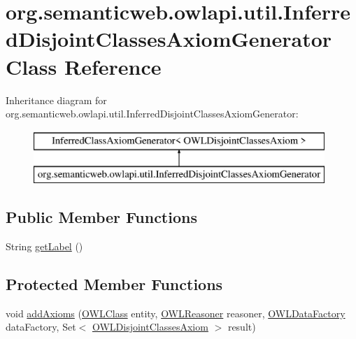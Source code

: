 \hypertarget{classorg_1_1semanticweb_1_1owlapi_1_1util_1_1_inferred_disjoint_classes_axiom_generator}{\section{org.\-semanticweb.\-owlapi.\-util.\-Inferred\-Disjoint\-Classes\-Axiom\-Generator Class Reference}
\label{classorg_1_1semanticweb_1_1owlapi_1_1util_1_1_inferred_disjoint_classes_axiom_generator}
}
Inheritance diagram for org.\-semanticweb.\-owlapi.\-util.\-Inferred\-Disjoint\-Classes\-Axiom\-Generator\-:\begin{figure}[H]
\begin{center}
\leavevmode
\includegraphics[height=2.000000cm]{classorg_1_1semanticweb_1_1owlapi_1_1util_1_1_inferred_disjoint_classes_axiom_generator}
\end{center}
\end{figure}
\subsection*{Public Member Functions}
\begin{DoxyCompactItemize}
\item 
String \hyperlink{classorg_1_1semanticweb_1_1owlapi_1_1util_1_1_inferred_disjoint_classes_axiom_generator_a35dfab107c6840751e97efc6fca793c7}{get\-Label} ()
\end{DoxyCompactItemize}
\subsection*{Protected Member Functions}
\begin{DoxyCompactItemize}
\item 
void \hyperlink{classorg_1_1semanticweb_1_1owlapi_1_1util_1_1_inferred_disjoint_classes_axiom_generator_a0fd3cd13f8f9547f9cc90bc89035357f}{add\-Axioms} (\hyperlink{interfaceorg_1_1semanticweb_1_1owlapi_1_1model_1_1_o_w_l_class}{O\-W\-L\-Class} entity, \hyperlink{interfaceorg_1_1semanticweb_1_1owlapi_1_1reasoner_1_1_o_w_l_reasoner}{O\-W\-L\-Reasoner} reasoner, \hyperlink{interfaceorg_1_1semanticweb_1_1owlapi_1_1model_1_1_o_w_l_data_factory}{O\-W\-L\-Data\-Factory} data\-Factory, Set$<$ \hyperlink{interfaceorg_1_1semanticweb_1_1owlapi_1_1model_1_1_o_w_l_disjoint_classes_axiom}{O\-W\-L\-Disjoint\-Classes\-Axiom} $>$ result)
\end{DoxyCompactItemize}


